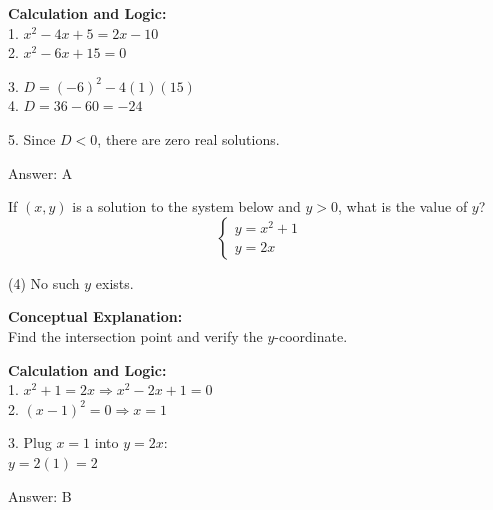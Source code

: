 \documentclass[11pt,paper=a4,answers]{exam}
\begin{document}
\begin{questions}
\begin{solution}
\vspace{20pt}

\textbf{Calculation and Logic:} \\
1. $x^2 - 4x + 5 = 2x - 10$ \\
2. $x^2 - 6x + 15 = 0$

\vspace{10pt}

3. $D = (-6)^2 - 4(1)(15)$ \\
4. $D = 36 - 60 = -24$

\vspace{10pt}

5. Since $D < 0$, there are zero real solutions.

\vspace{25pt}

Answer: \colorbox{yellow!100}{A}
\end{solution}

\vspace{40pt}

\question
If $(x, y)$ is a solution to the system below and $y > 0$, what is the value of $y$?
\[ \begin{cases} y = x^2 + 1 \\ y = 2x \end{cases} \]
\begin{tasks}(4)
    \task No such $y$ exists.
\end{tasks}

\begin{solution}
\textbf{Conceptual Explanation:} \\
Find the intersection point and verify the $y$-coordinate.

\vspace{20pt}

\textbf{Calculation and Logic:} \\
1. $x^2 + 1 = 2x \Rightarrow x^2 - 2x + 1 = 0$ \\
2. $(x - 1)^2 = 0 \Rightarrow x = 1$

\vspace{10pt}

3. Plug $x = 1$ into $y = 2x$: \\
   $y = 2(1) = 2$

\vspace{25pt}

Answer: \colorbox{yellow!100}{B}
\end{solution}


\end{questions}
\end{document}
